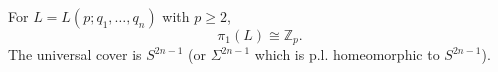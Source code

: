 For $L = L(p; q_1, \ldots, q_n)$ with $p \geq 2$,
$$\pi_1(L) \cong \mathbb{Z}_p.$$
The universal cover is $S^{2n-1}$ (or $\Sigma^{2n-1}$ which is p.l. homeomorphic to $S^{2n-1}$).
